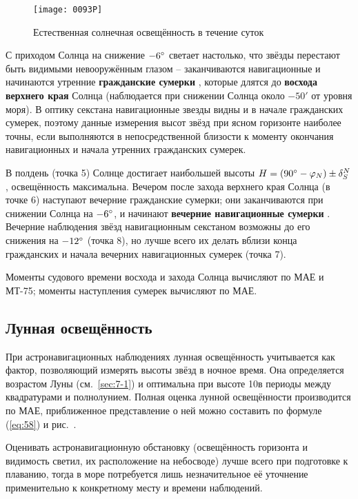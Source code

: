 \begin{figure*}[!htb]
  \centering
  \texttt{[image: 0093P]}
  \caption{Естественная солнечная освещённость в течение суток}
  \label{fig:93}
\end{figure*}

С приходом Солнца на снижение $-6^\circ$ светает настолько, что звёзды
перестают быть видимыми невооружённым глазом \--- заканчиваются
навигационные и начинаются утренние \textbf{гражданские сумерки}%
, которые
длятся до \textbf{восхода верхнего края} Солнца (наблюдается при снижении
Солнца около $-50'$ от уровня моря). В оптику секстана навигационные
звезды видны и в начале гражданских сумерек, поэтому данные измерения
высот звёзд при ясном горизонте наиболее точны, если выполняются в
непосредственной близости к моменту окончания навигационных и начала
утренних гражданских сумерек.

В полдень (точка 5) Солнце достигает наибольшей высоты
$H = (90^\circ - \varphi_N) \pm \delta^N_S$, освещённость
максимальна. Вечером после захода верхнего края Солнца (в точке 6)
наступают вечерние гражданские сумерки; они заканчиваются при снижении
Солнца на $-6^\circ$, и начинают \textbf{вечерние навигационные сумерки}%
. Вечерние
наблюдения звёзд навигационным секстаном возможны до его снижения на
$-12^\circ$ (точка 8), но лучше всего их делать вблизи конца гражданских
и начала вечерних навигационных сумерек (точка 7).

Моменты судового времени восхода и захода Солнца вычисляют по МАЕ и
МТ-75; моменты наступления сумерек вычисляют по МАЕ.

\subsection{Лунная освещённость}

При астронавигационных наблюдениях лунная освещённость учитывается как
фактор, позволяющий измерять высоты звёзд в ночное время. Она
определяется возрастом Луны (см.~\ref{sec:7-1}) и оптимальна при
высоте 10\gr в периоды между квадратурами и
полнолунием. Полная оценка лунной освещённости производится по МАЕ,
приближенное представление о ней можно составить по формуле
(\ref{eq:58}) и рис.~.

Оценивать астронавигационную обстановку (освещённость горизонта и
видимость светил, их расположение на небосводе) лучше всего при
подготовке к плаванию, тогда в море потребуется лишь незначительное её
уточнение применительно к конкретному месту и времени наблюдений.

